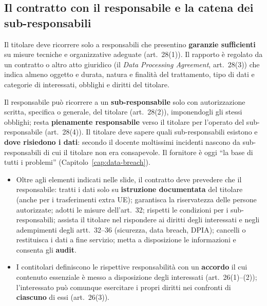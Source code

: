 \subsection{Il contratto con il responsabile e la catena dei sub-responsabili}
Il titolare deve ricorrere solo a responsabili che presentino \textbf{garanzie sufficienti} su misure
tecniche e organizzative adeguate (art.~28(1)). Il rapporto è regolato da un contratto o altro atto
giuridico (il \emph{Data Processing Agreement}, art.~28(3)) che indica almeno oggetto e durata, natura e
finalità del trattamento, tipo di dati e categorie di interessati, obblighi e diritti del titolare.

Il responsabile può ricorrere a un \textbf{sub-responsabile} solo con autorizzazione scritta, specifica o
generale, del titolare (art.~28(2)), imponendogli gli stessi obblighi; resta \textbf{pienamente
responsabile} verso il titolare per l'operato del sub-responsabile (art.~28(4)). Il titolare deve sapere
quali sub-responsabili esistono e \textbf{dove risiedono i dati}: secondo il docente moltissimi
incidenti nascono da sub-responsabili di cui il titolare non era consapevole. Il fornitore è oggi ``la
base di tutti i problemi'' (Capitolo~\ref{cap:data-breach}).

\begin{integrazione}
\begin{itemize}
  \item Oltre agli elementi indicati nelle slide, il contratto deve prevedere che il responsabile:
    tratti i dati solo su \textbf{istruzione documentata} del titolare (anche per i trasferimenti extra
    UE); garantisca la riservatezza delle persone autorizzate; adotti le misure dell'art.~32; rispetti le
    condizioni per i sub-responsabili; assista il titolare nel rispondere ai diritti degli interessati e
    negli adempimenti degli artt.~32--36 (sicurezza, data breach, DPIA); cancelli o restituisca i dati a
    fine servizio; metta a disposizione le informazioni e consenta gli \textbf{audit}.
  \item I contitolari definiscono le rispettive responsabilità con un \textbf{accordo} il cui contenuto
    essenziale è messo a disposizione degli interessati (art.~26(1)--(2)); l'interessato può comunque
    esercitare i propri diritti nei confronti di \textbf{ciascuno} di essi (art.~26(3)).
\end{itemize}
\end{integrazione}

